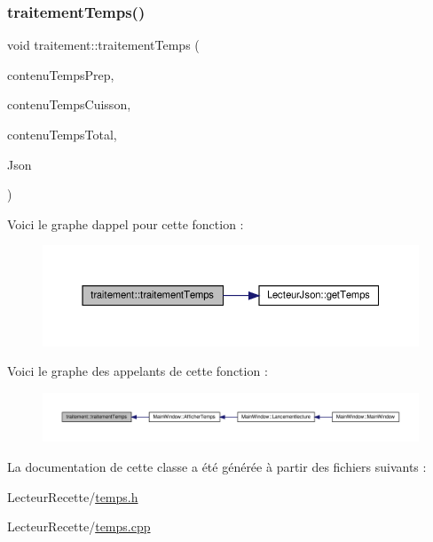 \subsubsection{\texorpdfstring{traitement\+Temps()}{traitementTemps()}}
{\footnotesize\ttfamily void traitement\+::traitement\+Temps (\begin{DoxyParamCaption}\item[{Q\+String\+List \&}]{contenu\+Temps\+Prep,  }\item[{Q\+String\+List \&}]{contenu\+Temps\+Cuisson,  }\item[{Q\+String\+List \&}]{contenu\+Temps\+Total,  }\item[{\hyperlink{class_lecteur_json}{Lecteur\+Json}}]{Json }\end{DoxyParamCaption})}

Voici le graphe d\textquotesingle{}appel pour cette fonction \+:
\nopagebreak
\begin{figure}[H]
\begin{center}
\leavevmode
\includegraphics[width=350pt]{classtraitement_a2bc46fa58a25e3f3bf87dfc4fd08ebf8_cgraph}
\end{center}
\end{figure}
Voici le graphe des appelants de cette fonction \+:
\nopagebreak
\begin{figure}[H]
\begin{center}
\leavevmode
\includegraphics[width=350pt]{classtraitement_a2bc46fa58a25e3f3bf87dfc4fd08ebf8_icgraph}
\end{center}
\end{figure}


La documentation de cette classe a été générée à partir des fichiers suivants \+:\begin{DoxyCompactItemize}
\item 
Lecteur\+Recette/\hyperlink{temps_8h}{temps.\+h}\item 
Lecteur\+Recette/\hyperlink{temps_8cpp}{temps.\+cpp}\end{DoxyCompactItemize}
